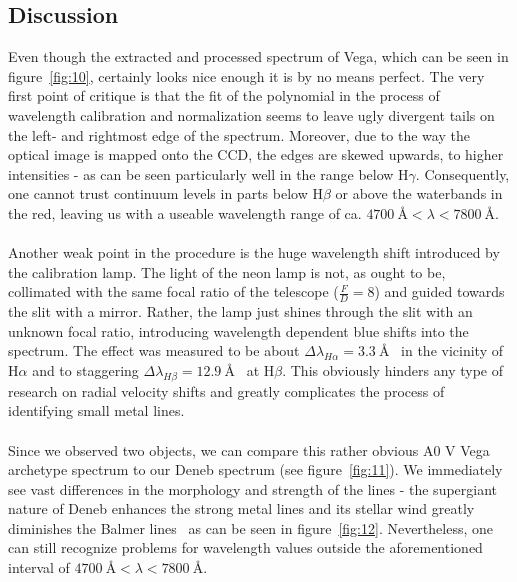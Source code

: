 \documentclass{article}
\begin{document}
\subsection{Discussion}
\label{ss:4}
Even though the extracted and processed spectrum of Vega, which can be seen in figure~\ref{fig:10}, certainly looks nice enough it is by no means perfect. The very first point of critique is that the fit of the polynomial in the process of wavelength calibration and normalization seems to leave ugly divergent tails on the left- and rightmost edge of the spectrum. Moreover, due to the way the optical image is mapped onto the CCD, the edges are skewed upwards, to higher intensities - as can be seen particularly well in the range below H$\gamma$.  Consequently, one cannot trust continuum levels in parts below H$\beta$ or above the waterbands in the red, leaving us with a useable wavelength range of ca. $\SI{4700}{\angstrom} < \lambda < \SI{7800}{\angstrom}$.\\\\Another weak point in the procedure is the huge wavelength shift introduced by the calibration lamp. The light of the neon lamp is not, as ought to be, collimated with the same focal ratio of the telescope ($\frac{F}{D}=8$) and guided towards the slit with a mirror. Rather, the lamp just shines through the slit with an unknown focal ratio, introducing wavelength dependent blue shifts into the spectrum. The effect was measured to be about $\Delta\lambda_{H\alpha} = \SI{3.3}{\angstrom}$ ~in the vicinity of H$\alpha$ and to staggering $\Delta\lambda_{H\beta} = \SI{12.9}{\angstrom}$ ~at H$\beta$. This obviously hinders any type of research on radial velocity shifts and greatly complicates the process of identifying small metal lines.\\\\
Since we observed two objects, we can compare this rather obvious A0 V Vega archetype spectrum to our Deneb spectrum (see figure~\ref{fig:11}). We immediately see vast differences in the morphology and strength of the lines - the supergiant nature of Deneb enhances the strong metal lines and its stellar wind greatly diminishes the Balmer lines~\parencite{Line_Variability} as can be seen in figure~\ref{fig:12}. Nevertheless, one can still recognize problems for wavelength values outside the aforementioned interval of $\SI{4700}{\angstrom} < \lambda < \SI{7800}{\angstrom}$.
\end{document}
